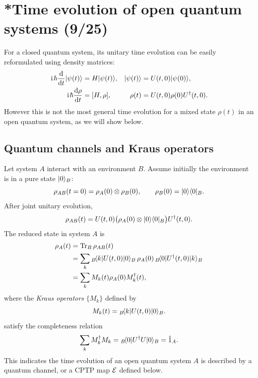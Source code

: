 \section{*Time evolution of open quantum systems (9/25)}


For a closed quantum system, its unitary time evolution can be easily reformulated using density matrices:
\begin{align}
 \hspace{1pt}\mathrm{i}\hspace{1pt}\hbar \frac{\mathrm{d}{}}{\mathrm{d} t}|{\psi(t)}\rangle&=H|{\psi(t)}\rangle, &
 |{\psi(t)}\rangle&=U(t,0)|{\psi(0)}\rangle,\\
 \hspace{1pt}\mathrm{i}\hspace{1pt}\hbar\frac{\mathrm{d}\rho}{\mathrm{d} t}&=[H,\rho], &
 \rho(t)&=U(t,0)\rho(0)U^\dagger(t,0).
\end{align}
However this is not the most general time evolution for a mixed state $\rho(t)$ in an open quantum system, as we will show below. 

\subsection{Quantum channels and Kraus operators}


Let system $A$ interact with an environment $B$. Assume initially the environment is in a pure state $|{0}\rangle_B$:
\begin{equation}
 \rho_{AB}(t=0)=\rho_A(0)\otimes\rho_B(0),
 \qquad \rho_B(0)=|0\rangle\langle0|_B.
\end{equation}
After joint unitary evolution,
\begin{equation}
 \rho_{AB}(t)=U(t,0)\bigl(\rho_A(0)\otimes|0\rangle\langle0|_B\bigr)U^\dagger(t,0).
\end{equation}
The reduced state in system $A$ is
\begin{align}
 \rho_A(t)
 &=\operatorname{Tr}_B\rho_{AB}(t)\\
 &=\sum_k {}_B\!\langle{k}|U(t,0)|{0}\rangle_B\,\rho_A(0)\,
 {}_B\!\langle{0}|U^\dagger(t,0)|{k}\rangle_B\\
 &=\sum_k M_k(t)\rho_A(0)M_k^\dagger(t),
\end{align}
where the \emph{Kraus operators} $\{M_k\}$ defined by 
\begin{equation}
 M_k(t)={}_B\!\langle{k}|U(t,0)|{0}\rangle_B.
\end{equation}
satisfy the completeness relation
\begin{equation}
 \sum_kM_k^\dagger M_k={}_B\!\langle{0}|U^\dagger U|{0}\rangle_B=\hat1_A.
\end{equation}
This indicates the time evolution of an open quantum system $A$ is described by a quantum channel, or a CPTP map $\mathcal{E}$ defined below.

